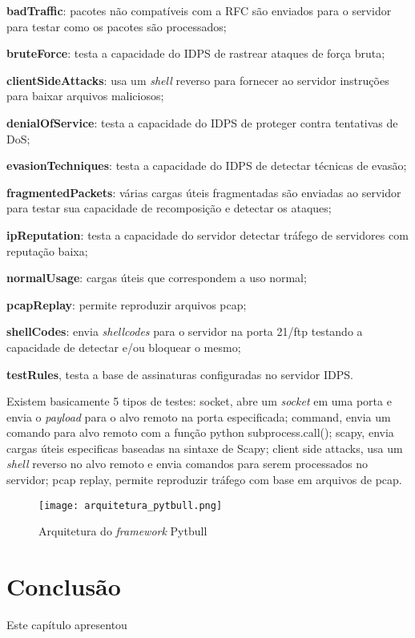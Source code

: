  \begin{alineas}
  \item \textbf{badTraffic}: pacotes não compatíveis com a RFC são enviados para o servidor para testar como os pacotes são processados; 
  \item \textbf{bruteForce}: testa a capacidade do IDPS de rastrear ataques de força bruta;
  \item \textbf{clientSideAttacks}: usa um \textit{shell} reverso para fornecer ao servidor instruções para baixar arquivos maliciosos; 
  \item \textbf{denialOfService}: testa a capacidade do IDPS de proteger contra tentativas de DoS; 
  \item \textbf{evasionTechniques}: testa a capacidade do IDPS de detectar técnicas de evasão; 
  \item \textbf{fragmentedPackets}: várias cargas úteis fragmentadas são enviadas ao servidor para testar sua capacidade de recomposição e detectar os ataques; 
  \item \textbf{ipReputation}: testa a capacidade do servidor detectar tráfego de servidores com reputação baixa;
  \item \textbf{normalUsage}: cargas úteis que correspondem a uso normal; 
  \item \textbf{pcapReplay}: permite reproduzir arquivos pcap; 
  \item \textbf{shellCodes}: envia \textit{shellcodes} para o servidor na porta 21/ftp testando a capacidade de detectar e/ou bloquear o mesmo; 
  \item \textbf{testRules}, testa a base de assinaturas configuradas no servidor IDPS.
 \end{alineas}

 Existem basicamente 5 tipos de testes: socket, abre um \textit{socket} em uma porta e envia o \textit{payload} para o alvo remoto na porta especificada; command, envia um comando para alvo remoto com a função python subprocess.call(); scapy, envia cargas úteis especificas baseadas na sintaxe de Scapy; client side attacks, usa um \textit{shell} reverso no alvo remoto e envia comandos para serem processados no servidor; pcap replay, permite reproduzir tráfego com base em arquivos de pcap.

 \begin{figure}[htb]
  \centering
  \caption{Arquitetura do \textit{framework} Pytbull}
  \texttt{[image: arquitetura\_pytbull.png]}
  \label{fig:pytbull}
 \end{figure}

 \section{Conclusão}

 Este capítulo apresentou
